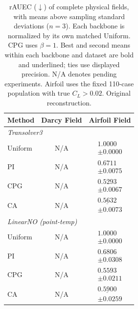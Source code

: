 \begin{table}[t]
\centering
\small
\caption{rAUEC ($\downarrow$) of complete physical fields, with means above sampling standard deviations ($n=3$). Each backbone is normalized by its own matched Uniform. CPG uses $\beta=1$. Best and second means within each backbone and dataset are bold and underlined; ties use displayed precision. N/A denotes pending experiments. Airfoil uses the fixed 110-case population with true $C_L>0.02$. Original reconstruction.}
\label{tab:linearno-standard-old}
\setlength{\tabcolsep}{8pt}
\renewcommand{\arraystretch}{1.15}
\begin{tabular}{lcc}
\toprule
Method & Darcy Field & Airfoil Field \\
\midrule
\multicolumn{3}{l}{\textit{Transolver3}} \\
Uniform & N/A & $\begin{gathered}1.0000\\[-2pt]\pm 0.0000\end{gathered}$ \\
PI & N/A & $\begin{gathered}0.6711\\[-2pt]\pm 0.0075\end{gathered}$ \\
CPG & N/A & $\begin{gathered}\mathbf{0.5293}\\[-2pt]\pm 0.0067\end{gathered}$ \\
CA & N/A & $\begin{gathered}\underline{0.5632}\\[-2pt]\pm 0.0073\end{gathered}$ \\
\midrule
\multicolumn{3}{l}{\textit{LinearNO (point-temp)}} \\
Uniform & N/A & $\begin{gathered}1.0000\\[-2pt]\pm 0.0000\end{gathered}$ \\
PI & N/A & $\begin{gathered}0.6806\\[-2pt]\pm 0.0308\end{gathered}$ \\
CPG & N/A & $\begin{gathered}\mathbf{0.5593}\\[-2pt]\pm 0.0211\end{gathered}$ \\
CA & N/A & $\begin{gathered}\underline{0.5900}\\[-2pt]\pm 0.0259\end{gathered}$ \\
\bottomrule
\end{tabular}
\end{table}
